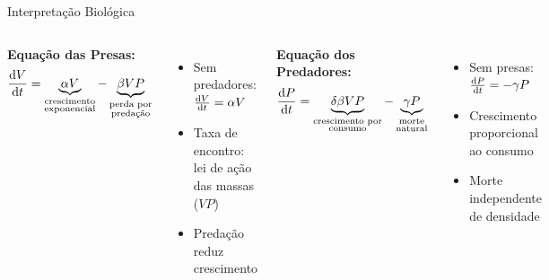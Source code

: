 \begin{frame}{Interpretação Biológica}
\begin{columns}
\textbf{Equação das Presas:}
\begin{equation*}
\frac{\mathrm{d} V}{\mathrm{d} t} = \underbrace{\alpha V}_{\substack{\text{crescimento}\\\text{exponencial}}} - \underbrace{\beta V P}_{\substack{\text{perda por}\\\text{predação}}}
\end{equation*}

\begin{itemize}
    \item Sem predadores: $\frac{\mathrm{d} V}{\mathrm{d} t} = \alpha V$
    \item Taxa de encontro: lei de ação das massas ($VP$)
    \item Predação reduz crescimento
\end{itemize}

\textbf{Equação dos Predadores:}
\begin{equation*}
\frac{\mathrm{d} P}{\mathrm{d} t} = \underbrace{\delta \beta V P}_{\substack{\text{crescimento por}\\\text{consumo}}} - \underbrace{\gamma P}_{\substack{\text{morte}\\\text{natural}}}
\end{equation*}

\begin{itemize}
    \item Sem presas: $\frac{\mathrm{d} P}{\mathrm{d} t} = -\gamma P$
    \item Crescimento proporcional ao consumo
    \item Morte independente de densidade
\end{itemize}
\end{columns}

\vspace{0.3cm}

\end{frame}

